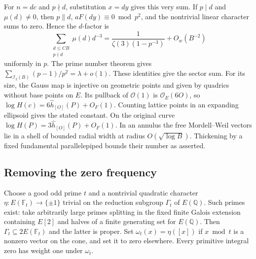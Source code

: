 \documentclass[11pt]{article}
\begin{document}
For $n=dc$ and $p\nmid d$, substitution $x=dy$ gives this very sum. If $p\mid d$ and $\mu(d)\ne0$, then $p\|d$, $aF(dy)\equiv0\bmod p^2$, and the nontrivial linear character sums to zero. Hence the $d$-factor is
\[
 \sum_{\substack{d\le CB\\p\nmid d}}\mu(d)d^{-3}
   =\frac{1}{\zeta(3)(1-p^{-3})}+O_{w}(B^{-2})
\]
uniformly in $p$. The prime number theorem gives $\sum_{\mathcal I_2(B)}(p-1)/p^2=\lambda+o(1)$. These identities give the sector sum. For its size, the Gauss map is injective on geometric points and given by quadrics without base points on $E$. Its pullback of $\mathcal O(1)$ is $\mathcal O_E(6O)$, so $\log H(c)=6\widehat h_{[O]}(P)+O_F(1)$. Counting lattice points in an expanding ellipsoid gives the stated constant. On the original curve $\log H(P)=3\widehat h_{[O]}(P)+O_F(1)$. In an annulus the free Mordell--Weil vectors lie in a shell of bounded radial width at radius $O(\sqrt{\log B})$. Thickening by a fixed fundamental parallelepiped bounds their number as asserted.

\subsection{Removing the zero frequency}
Choose a good odd prime $t$ and a nontrivial quadratic character $\eta:E(\mathbb F_t)\to\{\pm1\}$ trivial on the reduction subgroup $\Gamma_t$ of $E(\mathbb Q)$. Such primes exist: take arbitrarily large primes splitting in the fixed finite Galois extension containing $E[2]$ and halves of a finite generating set for $E(\mathbb Q)$. Then $\Gamma_t\subseteq2E(\mathbb F_t)$ and the latter is proper. Set $\omega_t(x)=\eta([x])$ if $x\bmod t$ is a nonzero vector on the cone, and set it to zero elsewhere. Every primitive integral zero has weight one under $\omega_t$.
\end{document}
